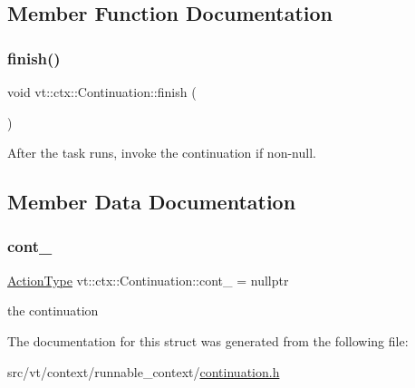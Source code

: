 \subsection{Member Function Documentation}
\mbox{\label{structvt_1_1ctx_1_1_continuation_a96c577862c9c9f2e477cfd25d6327872}} 
\subsubsection{\texorpdfstring{finish()}{finish()}}
{\footnotesize\ttfamily void vt\+::ctx\+::\+Continuation\+::finish (\begin{DoxyParamCaption}{ }\end{DoxyParamCaption})\hspace{0.3cm}{\ttfamily [inline]}}



After the task runs, invoke the continuation if non-\/null. 



\subsection{Member Data Documentation}
\mbox{\label{structvt_1_1ctx_1_1_continuation_aadaa0a147af8e8bba30684a098a5eb39}} 
\subsubsection{\texorpdfstring{cont\+\_\+}{cont\_}}
{\footnotesize\ttfamily \hyperlink{namespacevt_ae0a5a7b18cc99d7b732cb4d44f46b0f3}{Action\+Type} vt\+::ctx\+::\+Continuation\+::cont\+\_\+ = nullptr\hspace{0.3cm}{\ttfamily [private]}}

the continuation 

The documentation for this struct was generated from the following file\+:\begin{DoxyCompactItemize}
\item 
src/vt/context/runnable\+\_\+context/\hyperlink{continuation_8h}{continuation.\+h}\end{DoxyCompactItemize}
